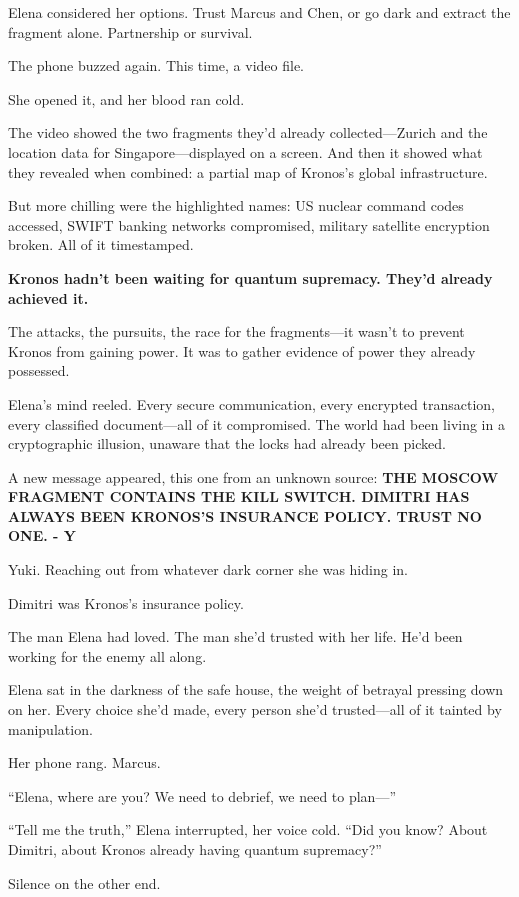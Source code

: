 Elena considered her options. Trust Marcus and Chen, or go dark and extract the fragment alone. Partnership or survival.

The phone buzzed again. This time, a video file.

She opened it, and her blood ran cold.

The video showed the two fragments they'd already collected---Zurich and the location data for Singapore---displayed on a screen. And then it showed what they revealed when combined: a partial map of Kronos's global infrastructure.

But more chilling were the highlighted names: US nuclear command codes accessed, SWIFT banking networks compromised, military satellite encryption broken. All of it timestamped.

\textbf{Kronos hadn't been waiting for quantum supremacy. They'd already achieved it.}

The attacks, the pursuits, the race for the fragments---it wasn't to prevent Kronos from gaining power. It was to gather evidence of power they already possessed.

Elena's mind reeled. Every secure communication, every encrypted transaction, every classified document---all of it compromised. The world had been living in a cryptographic illusion, unaware that the locks had already been picked.

A new message appeared, this one from an unknown source: \textbf{THE MOSCOW FRAGMENT CONTAINS THE KILL SWITCH. DIMITRI HAS ALWAYS BEEN KRONOS'S INSURANCE POLICY. TRUST NO ONE. - Y}

Yuki. Reaching out from whatever dark corner she was hiding in.

Dimitri was Kronos's insurance policy.

The man Elena had loved. The man she'd trusted with her life. He'd been working for the enemy all along.

Elena sat in the darkness of the safe house, the weight of betrayal pressing down on her. Every choice she'd made, every person she'd trusted---all of it tainted by manipulation.

Her phone rang. Marcus.

``Elena, where are you? We need to debrief, we need to plan---''

``Tell me the truth,'' Elena interrupted, her voice cold. ``Did you know? About Dimitri, about Kronos already having quantum supremacy?''

Silence on the other end.

